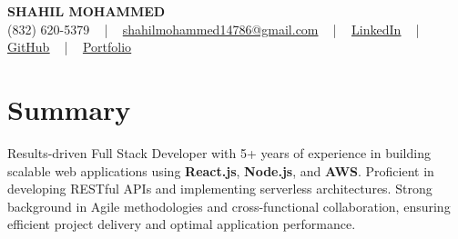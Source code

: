 \documentclass[letterpaper,10pt]{article}
\begin{document}
\begin{center}
    {\fontsize{14pt}{12pt}\selectfont \textbf{\MakeUppercase{Shahil Mohammed}}}\\ \vspace{2pt}
    \fontsize{10pt}{12pt}\selectfont (832) 620-5379 ~ | ~ \href{mailto:shahilmohammed14786@gmail.com}{shahilmohammed14786@gmail.com} ~ | ~  
    \href{https://www.linkedin.com/in/shahil-mohammed-9652931a1/}{\color{blue}\underline{LinkedIn}}  ~ | ~ 
    \href{https://github.com/freakbeast14}{\color{blue}\underline{GitHub}} ~ | ~ 
    \href{https://shahil-mohammed.netlify.app/}{\color{blue}\underline{Portfolio}}
    \vspace{-8pt}
\end{center}

\section{Summary}
\vspace{-2pt}\fontsize{8pt}{9pt}\selectfont
Results-driven Full Stack Developer with 5+ years of experience in building scalable web applications using \textbf{React.js}, \textbf{Node.js}, and \textbf{AWS}. Proficient in developing RESTful APIs and implementing serverless architectures. Strong background in Agile methodologies and cross-functional collaboration, ensuring efficient project delivery and optimal application performance.

\vspace{-5pt}
 
\vspace{-2pt}
\end{document}
